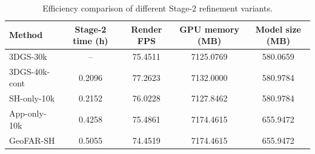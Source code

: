 ﻿\begin{table}[t]
\centering
\caption{Efficiency comparison of different Stage-2 refinement variants.}
\label{tab:efficiency_comparison}
\begin{tabular}{lcccc}
\hline
Method & Stage-2 time (h) & Render FPS & GPU memory (MB) & Model size (MB) \\
\hline
3DGS-30k & -- & 75.4511 & 7125.0769 & 580.0659 \\
3DGS-40k-cont & 0.2096 & 77.2623 & 7132.0000 & 580.9784 \\
SH-only-10k & 0.2152 & 76.0228 & 7127.8462 & 580.9784 \\
App-only-10k & 0.4258 & 75.4861 & 7174.4615 & 655.9472 \\
GeoFAR-SH & 0.5055 & 74.4519 & 7174.4615 & 655.9472 \\
\hline
\end{tabular}
\end{table}



